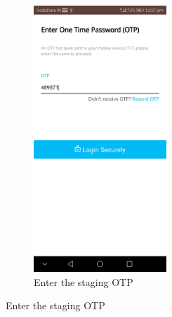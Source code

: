 \documentclass{report}
\begin{document}
\begin{figure}[h!]
\begin{subfigure}[h!]{.3\textwidth}
\includegraphics[width=5cm]{paytm_otp.jpg}
\caption{\centering \tiny Enter the staging OTP}
\end{subfigure}


\end{figure}
\end{document}
